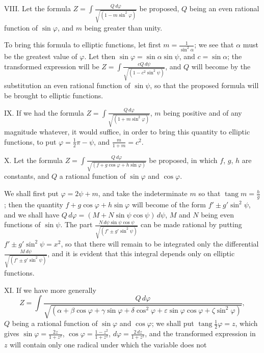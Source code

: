 \documentclass{article}
\begin{document}

VIII. Let the formula $Z=\displaystyle\int\frac{Q\,d\varphi}{\sqrt{(1-m\sin^{2}\varphi)}}$ be proposed, $Q$ being an even rational function of $\sin\varphi$, and $m$ being greater than unity.

To bring this formula to elliptic functions, let first $m=\frac{1}{\sin^{2}\alpha}$; we see that $\alpha$ must be the greatest value of $\varphi$. Let then $\sin\varphi=\sin\alpha\sin\psi$, and $c=\sin\alpha$; the transformed expression will be $Z=\displaystyle\int\frac{cQ\,d\psi}{\sqrt{(1-c^{2}\sin^{2}\psi)}}$, and $Q$ will become by the substitution an even rational function of $\sin\psi$, so that the proposed formula will be brought to elliptic functions.

IX. If we had the formula $Z=\displaystyle\int\frac{Q\,d\varphi}{\sqrt{(1+m\sin^{2}\varphi)}}$, $m$ being positive and of any magnitude whatever, it would suffice, in order to bring this quantity to elliptic functions, to put $\varphi=\frac{1}{2}\pi-\psi$, and $\frac{m}{1+m}=c^{2}$.

X. Let the formula $Z=\displaystyle\int\frac{Q\,d\varphi}{\sqrt{(f+g\cos\varphi+h\sin\varphi)}}$ be proposed, in which $f$, $g$, $h$ are constants, and $Q$ a rational function of $\sin\varphi$ and $\cos\varphi$.

We shall first put $\varphi=2\psi+m$, and take the indeterminate $m$ so that $\operatorname{tang}m=\frac{h}{g}$; then the quantity $f+g\cos\varphi+h\sin\varphi$ will become of the form $f'\pm g'\sin^{2}\psi$, and we shall have $Q\,d\varphi=(M+N\sin\psi\cos\psi)\,d\psi$, $M$ and $N$ being even functions of $\sin\psi$. The part $\frac{N\,d\psi\sin\psi\cos\psi}{\sqrt{(f'\pm g'\sin^{2}\psi)}}$ can be made rational by putting $f'\pm g'\sin^{2}\psi=x^{2}$, so that there will remain to be integrated only the differential $\frac{M\,d\psi}{\sqrt{(f'\pm g'\sin^{2}\psi)}}$, and it is evident that this integral depends only on elliptic functions.

XI. If we have more generally
\[ Z=\int\frac{Q\,d\varphi}{\sqrt{(\alpha+\beta\cos\varphi+\gamma\sin\varphi+\delta\cos^{2}\varphi+\varepsilon\sin\varphi\cos\varphi+\zeta\sin^{2}\varphi)}}, \]
$Q$ being a rational function of $\sin\varphi$ and $\cos\varphi$; we shall put $\operatorname{tang}\frac{1}{2}\varphi=z$, which gives $\sin\varphi=\frac{2z}{1+z^{2}}$, $\cos\varphi=\frac{1-z^{2}}{1+z^{2}}$, $d\varphi=\frac{2\,dz}{1+z^{2}}$, and the transformed expression in $z$ will contain only one radical under which the variable does not
\end{document}
